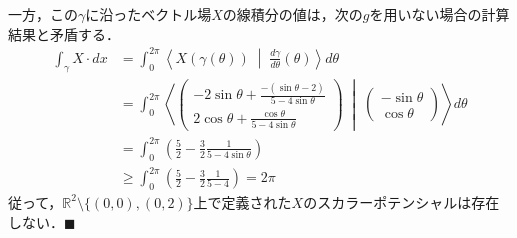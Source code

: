 \documentclass[dvipdfmx,a4paper,uplatex]{jsarticle}
\begin{document}
一方，この$\gamma$に沿ったベクトル場$X$の線積分の値は，次の$g$を用いない場合の計算結果と矛盾する．
\begin{align*}
    \int_\gamma X\cdot dx &= \int^{2\pi}_0\left\langle X(\gamma(\theta))\;\middle|\;\frac{d\gamma}{d\theta}(\theta)\right\rangle d\theta \\
    &= \int^{2\pi}_0\left\langle\begin{pmatrix}-2\sin\theta+\frac{-(\sin\theta-2)}{5-4\sin\theta}\\2\cos\theta+\frac{\cos\theta}{5-4\sin\theta}\end{pmatrix}\;\middle|\;\begin{pmatrix}-\sin\theta\\\cos\theta\end{pmatrix}\right\rangle d\theta \\
    &= \int^{2\pi}_0 \left(\frac{5}{2}-\frac{3}{2}\frac{1}{5-4\sin\theta}\right) \\
    &\ge\int^{2\pi}_0\left(\frac{5}{2}-\frac{3}{2}\frac{1}{5-4}\right) = 2\pi
\end{align*}
従って，$\mathbb{R}^2\setminus\{(0,0),(0,2)\}$上で定義された$X$のスカラーポテンシャルは存在しない．$\blacksquare$
\clearpage
\end{document}
